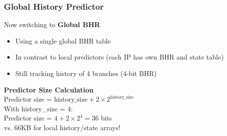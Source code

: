 \documentclass[aspectratio=169,12pt]{beamer}
\begin{document}
\begin{frame}
  \frametitle{Global History Predictor}
  \begin{center}
    \Large Now switching to \textbf{Global BHR}
  \end{center}
  
  \vspace{1em}
  
  \begin{itemize}
    \item Using a single global BHR table
    \item In contrast to local predictors (each IP has own BHR and state table)
    \item Still tracking history of 4 branches (4-bit BHR)
  \end{itemize}
  
  \vspace{1em}
  
  \begin{tcolorbox}[colback=blue!10, colframe=blue!50, width=0.8\textwidth]
    \centering
    \textbf{Predictor Size Calculation}\\[0.5em]
    Predictor size = $\text{history\_size} + 2 \times 2^{\text{history\_size}}$\\[0.3em]
    With history\_size = 4:\\
    Predictor size = $4 + 2 \times 2^4 = 36$ bits\\[0.3em]
    \textcolor{correctgreen}{vs. 66KB for local history/state arrays!}
  \end{tcolorbox}
\end{frame}







\end{document}
